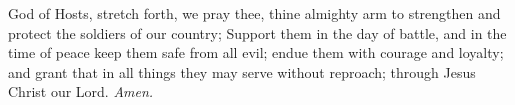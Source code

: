 

 God of Hosts, stretch forth, we pray thee, thine almighty arm to strengthen and protect the soldiers of our country; Support them in the day of battle, and in the time of peace keep them safe from all evil; endue them with courage and loyalty; and grant that in all things they may serve without reproach; through Jesus Christ our Lord. \textit{Amen.}




